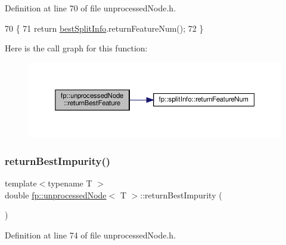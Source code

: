 Definition at line 70 of file unprocessed\+Node.\+h.


\begin{DoxyCode}
70                                               \{
71                     \textcolor{keywordflow}{return} \hyperlink{classfp_1_1unprocessedNode_a9146bd750d1f533e712634873551d060}{bestSplitInfo}.returnFeatureNum();
72                 \}
\end{DoxyCode}
Here is the call graph for this function\+:\nopagebreak
\begin{figure}[H]
\begin{center}
\leavevmode
\includegraphics[width=350pt]{classfp_1_1unprocessedNode_a32e9c381659db64022fa0491de48f70c_cgraph}
\end{center}
\end{figure}
\mbox{\label{classfp_1_1unprocessedNode_a1b147714de502bcff5c727d2ce9144f8}} 
\subsubsection{\texorpdfstring{return\+Best\+Impurity()}{returnBestImpurity()}}
{\footnotesize\ttfamily template$<$typename T $>$ \\
double \hyperlink{classfp_1_1unprocessedNode}{fp\+::unprocessed\+Node}$<$ T $>$\+::return\+Best\+Impurity (\begin{DoxyParamCaption}{ }\end{DoxyParamCaption})\hspace{0.3cm}{\ttfamily [inline]}}



Definition at line 74 of file unprocessed\+Node.\+h.



